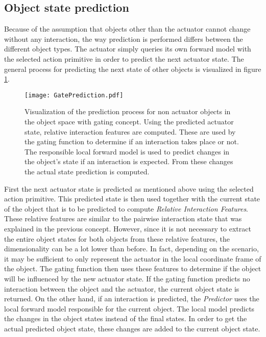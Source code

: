 \subsection{Object state prediction \label{sec:gatePrediction}}

Because of the assumption that objects other than the actuator cannot change without any interaction, the way prediction is performed differs between the different object types. The actuator simply queries its own forward model with the selected action primitive in order to predict the next actuator state. 
The general process for predicting the next state of other objects is visualized in figure \ref{fig:GatePrediction}.

\begin{figure}
	\centering
	\texttt{[image: GatePrediction.pdf]}
	\caption{Visualization of the prediction process for non actuator objects in the object space with gating concept. Using the predicted actuator state, relative interaction features are computed. These are used by the gating function to determine if an interaction takes place or not. The responsible local forward model is used to predict 
	changes in the object's state if an interaction is expected. From these changes the actual state prediction is computed.} 
	\label{fig:GatePrediction}
\end{figure}

First the next actuator state is predicted as mentioned above using the selected action primitive.
This predicted state is then used together with the current state of the object that is to be predicted to compute \textit{Relative Interaction Features}. These relative features are similar to the pairwise interaction state that was explained in the previous concept. However, since it is not necessary to extract the entire object states for both objects from these relative features, the dimensionality can be a lot lower than before. In fact, depending on the scenario, it may be sufficient to only represent the actuator in the local coordinate frame of the object. 
The gating function then uses these features to determine if the object will be influenced by the new actuator state. If the gating function predicts no interaction between the object and the actuator, the current object state is returned. 
On the other hand, if an interaction is predicted, the \textit{Predictor} uses the local forward model responsible for the current object. 
The local model predicts the changes in the object states instead of the final states. In order to get the actual predicted object state, these changes are added to the current object state.

